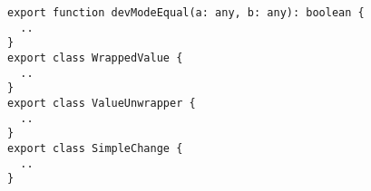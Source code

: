 \begin{verbatim}
export function devModeEqual(a: any, b: any): boolean {
  ..
}
export class WrappedValue {
  ..
}
export class ValueUnwrapper {
  ..
}
export class SimpleChange {
  ..
}
\end{verbatim}
